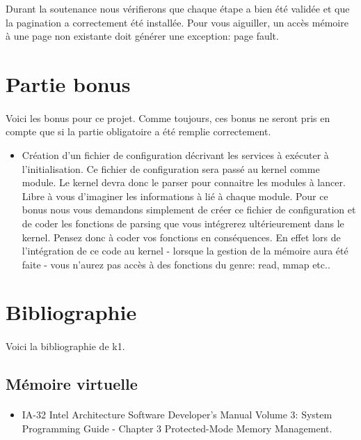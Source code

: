 \documentclass[10pt,a4wide]{article}
\begin{document}
Durant la soutenance nous v\'erifierons que chaque \'etape a bien \'et\'e
valid\'ee et que la pagination a correctement \'et\'e install\'ee. Pour vous
aiguiller, un acc\`es m\'emoire \`a une page non existante doit g\'en\'erer
une exception: page fault.

\section{Partie bonus}

\paragraph{}

Voici les bonus pour ce projet. Comme toujours, ces bonus ne seront pris
en compte que si la partie obligatoire a \'et\'e remplie correctement.

\begin{itemize}
\item Cr\'eation d'un fichier de configuration d\'ecrivant les services \`a
      ex\'ecuter \`a l'initialisation. Ce fichier de configuration
      sera pass\'e au kernel comme module. Le kernel devra donc le parser
      pour connaitre les modules \`a lancer. Libre \`a vous d'imaginer les
      informations \`a li\'e \`a chaque module. Pour ce bonus
      nous vous demandons simplement de cr\'eer ce fichier de configuration
      et de coder les fonctions de parsing que vous int\'egrerez
      ult\'erieurement dans le kernel. Pensez donc \`a coder vos fonctions
      en cons\'equences. En effet lors de l'int\'egration de ce code
      au kernel - lorsque la gestion de la m\'emoire aura \'et\'e faite -
      vous n'aurez pas acc\`es \`a des fonctions du genre: read, mmap etc..
\end{itemize}

\section{Bibliographie}

\paragraph{}

Voici la bibliographie de k1.

\subsection{M\'emoire virtuelle}

\paragraph{}

\begin{itemize}
\item IA-32 Intel Architecture Software Developer's Manual Volume 3:
      System Programming Guide - Chapter 3 Protected-Mode Memory Management.
\end{itemize}
\end{document}

